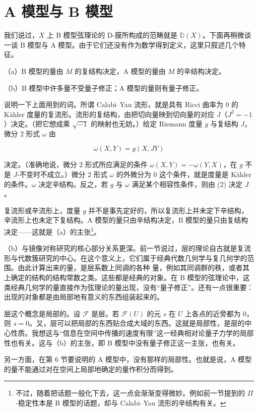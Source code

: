 \section{A 模型与 B 模型}

我们说过，$X$ 上 B 模型弦理论的 D-膜所构成的范畴就是 $\mathbb{D}(X)$。下面再稍微谈一谈 B 模型与 A 模型。由于它们还没有作为数学得到定义，这里只叙述几个特征。

（a）B 模型的量由 $M$ 的复结构决定，A 模型的量由 $M$ 的辛结构决定。

（b）B 模型中许多量不受量子修正；A 模型的量则有量子修正。

说明一下上面用到的词。所谓 Calabi--Yau 流形，就是具有 Ricci 曲率为 0 的 Kähler 度量的复流形。流形的复结构，由把切向量映到切向量的对应 $J$（$J^2 = -1$）决定。（把它想成乘 $\sqrt{-1}$ 的映射也无妨。）给定 Riemann 度量 $g$ 与复结构 $J$，微分 2 形式 $\omega$ 由

\[
  \omega(X,Y) = g(X,JY) \tag{2}
\]

决定。（准确地说，微分 2 形式所应满足的条件 $\omega(X,Y) = -\omega(Y,X)$，在 $g$ 不是 $J$-不变时不成立。）微分 2 形式 $\omega$ 的外微分为 0 这个条件，就是度量是 Kähler 的条件。$\omega$ 决定辛结构。反之，若 $g$ 与 $\omega$ 满足某个相容性条件，则由 (2) 决定 $J$。

复流形或辛流形上，度量 $g$ 并不是事先定好的，所以复流形上并未定下辛结构，辛流形上也未定下复结构。A 模型的量只由辛结构决定，B 模型的量只由复结构决定——这就是（a）的主张\footnote{不过，随着把话题一般化下去，这一点会渐渐变得微妙。例如前一节提到的 $\Pi$-稳定性本是 B 模型的话题，却与 Calabi--Yau 流形的辛结构有关。}。

（b）与镜像对称研究的核心部分关系更深。前一节说过，层的理论自古就是复流形与代数簇研究的中心。在这个意义上，它们属于经典代数几何学与复几何学的范围。由此计算出来的量，是层系数上同调的各种
量，例如其同调群的秩，或者其上确定的结构的结构常数之类。这些都是经典的对象。在 B 模型的弦理论中，这类经典几何学的量直接作为弦理论的量出现，没有“量子修正”。还有一点很重要：出现的对象都是由局部地有意义的东西组装起来的。

层这个概念是局部的。设 $\mathcal{F}$ 是层。若 $\mathcal{F}(U)$ 的元 $s$ 在 $U$ 上各点的近旁都为 0，则 $s = 0$。又，层可以把局部的东西贴合成大域的东西。这就是局部性，是层的中心性质。我想这与“信息在空间中传播的速度有限”这一经典相对论量子力学的局部性也有关。这与（b）的主张，即 B 模型中没有量子修正这一主张，也有关。

另一方面，在第 6 节要说明的 A 模型中，没有那样的局部性。也就是说，A 模型的量不能通过对在空间上局部地确定的量作积分而得到。


